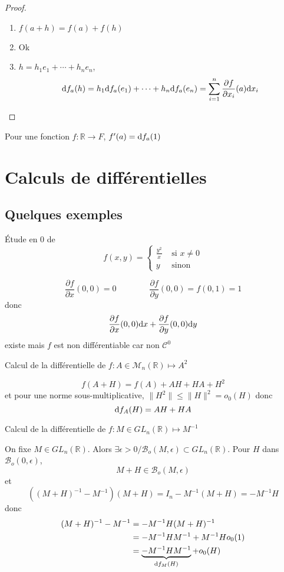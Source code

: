 \begin{proof} ~
\begin{enumerate}
    \item $f(a+h)=f(a)+f(h)$
    \item Ok
    \item $h=h_1e_1+\cdots +h_ne_n$, \[
        \mathrm{d} f_a(h)=h_1\mathrm{d} f_a(e_1)+\cdots +h_n\mathrm{d} f_a(e_n)=\sum_{i=1}^n\frac{\partial f}{\partial x_i}(a)\mathrm{d} x_i
    \]
\end{enumerate}
\end{proof}

\begin{rem}
Pour une fonction $f:\mathbb R\longrightarrow F$, $f'(a)=\mathrm{d} f_a(1)$
\end{rem}

\section{Calculs de différentielles}

\subsection{Quelques exemples}
\begin{ex} Étude en $0$ de
\[
    f(x, y)=\begin{cases}
    \frac{y^2}x &\text{ si }x\neq 0\\ y & \text{ sinon}
    \end{cases}
\]
\end{ex}

\[
\frac{\partial f}{\partial x}(0, 0)=0 \qquad\qquad \frac{\partial f}{\partial y}(0, 0)=f(0, 1)=1
\]
donc \[
\frac{\partial f}{\partial x}(0, 0) \mathrm{d} x+ \frac{\partial f}{\partial y}(0, 0)\mathrm{d} y
\]
existe mais $f$ est non différentiable car non $\mathcal C^0$

\begin{ex} Calcul de la différentielle de
{$f:A\in\mathcal M_n(\mathbb R)\longmapsto A^2$}
\end{ex}

\[
    f(A+H)=f(A)+AH+HA+H^2
\]
et pour une norme sous-multiplicative, $\|H^2\|\leq \|H\|^2=o_0(H)$ donc \[
    \mathrm{d} f_A(H)=AH+HA
\]

\begin{ex} Calcul de la différentielle de
{$f:M\in GL_n(\mathbb R)\longmapsto M^{-1}$}
\end{ex}

On fixe $M\in GL_n(\mathbb R)$. Alors $\exists \epsilon >0 / \mathcal B_o(M, \epsilon)\subset GL_n(\mathbb R)$. Pour $H$ dans $\mathcal B_o(0, \epsilon)$, \[
    M+H\in\mathcal B_o(M, \epsilon)
\]
et \[
    \left((M+H)^{-1}-M^{-1}\right)(M+H)=I_n-M^{-1}(M+H)=-M^{-1}H
    \] donc
    \begin{align*}
    (M+H)^{-1}-M^{-1}&=-M^{-1}H(M+H)^{-1}\\&=-M^{-1}HM^{-1}+M^{-1}Ho_0(1)\\&=\underbrace{-M^{-1}HM^{-1}}_{\mathrm{d} f_M(H)}+o_0(H)
\end{align*}

